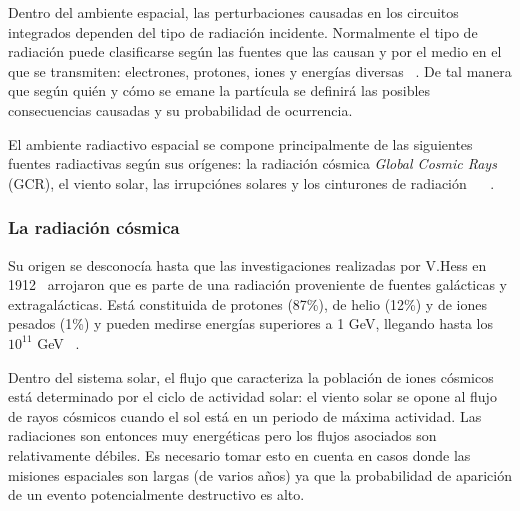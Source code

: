 Dentro del ambiente espacial, las perturbaciones causadas en los circuitos integrados dependen del tipo de radiación incidente. Normalmente el tipo de radiación puede clasificarse según las fuentes que las causan y por el medio en el que se transmiten: electrones, protones, iones y  energías diversas ~\cite{boudenot1995}. De tal manera que según quién y cómo se emane la partícula se definirá las posibles consecuencias causadas y su probabilidad de ocurrencia. 

El ambiente radiactivo espacial se compone principalmente de las siguientes fuentes radiactivas según sus orígenes: la radiación cósmica \textit{Global Cosmic Rays } (GCR), el viento solar, las irrupciónes solares y los cinturones de radiación ~\cite{stapor1988} ~\cite{tang2004semm}.

\subsubsection{La radiación cósmica}
Su origen se desconocía hasta que las investigaciones realizadas por V.Hess en 1912~\cite{bourrieau1991environnement} arrojaron que es parte de una radiación proveniente de fuentes galácticas y extragalácticas. Está constituida de protones (87\%), de helio (12\%) y de iones pesados (1\%) y pueden medirse energías  superiores a 1 GeV, llegando hasta los $10^{11}$ GeV ~\cite{fleischer1975nuclear}. 

Dentro del sistema solar, el flujo que caracteriza la población de iones cósmicos está determinado por el ciclo de actividad solar: el viento solar se opone al flujo de rayos cósmicos cuando el sol está en un periodo de máxima actividad. Las radiaciones son entonces muy energéticas pero los flujos asociados son relativamente débiles. Es necesario tomar esto en cuenta en casos donde las misiones espaciales son largas (de varios años) ya que la probabilidad de aparición de un evento potencialmente destructivo es alto. 